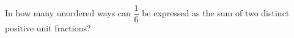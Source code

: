 In how many unordered ways can $\dfrac{1}{6}$ be expressed as the sum of two distinct positive unit fractions?
